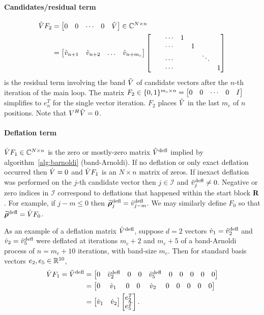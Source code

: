 \paragraph{Candidates/residual term}
\begin{align*}
\hat{V} F_2 &= \begin{bmatrix} 0&0&\cdots&0&\hat{V}\end{bmatrix}\in\mathbb{C}^{N \times n}\\
&= \begin{bmatrix} \hat{v}_{n+1}&\hat{v}_{n+2} &\ldots&\hat{v}_{n+ m_c}\end{bmatrix}
\begin{bmatrix} &&\cdots&1\\
 &&\cdots&&1 \\
    &&\cdots&&&\ddots \\ 
    &&\cdots&&&&1 \end{bmatrix}
\end{align*}
 is the residual term involving the band $\hat{V}$ of candidate vectors after the $n$-th iteration of the main loop.
The matrix $F_2\in\{0,1 \}^{m_c\times n}=\begin{bmatrix} 0&0&\cdots&0&I\end{bmatrix}$ simplifies to $e^T_n$ for the single vector iteration.  $F_2$ places $\hat{V}$ in the last $m_c$ of $n$ positions.   Note that $V^H\hat{V}=0$.



\paragraph{Deflation term}
$\dot{V} F_1\in\mathbb{C}^{N\times n}$ is the zero or mostly-zero matrix $\hat{V}^{\text{defl}}$ implied by algorithm~\ref{alg:barnoldi} (band-Arnoldi).  If no deflation or only exact deflation occurred then $\dot{V}=0$ and $\dot{V} F_1$ is an $N\times n$ matrix of zeros.   If inexact deflation was performed on the $j$-th candidate vector then $j\in\mathcal{I}$ and $\hat{v}^{\text{defl}}_j\neq 0$.   Negative or zero indices  in $\mathcal{I}$ correspond to deflations that happened within the start block $\textbf{\textup{R}}$.  For example, if $j-m\leq 0$ then $\widetilde{\boldsymbol{\rho}}^{\text{defl}}_j=\hat{v}^{\text{defl}}_{j-m}$.   We may similarly define $F_0$ so that $\widetilde{\boldsymbol{\rho}}^{\text{defl}}=\dot{V} F_0$.

As an example of a deflation matrix $ \hat{V}^{\text{defl}} $,  suppose $d=2$ vectors $\dot{v}_1=\hat{v}^{\text{defl}}_2$ and $\dot{v}_2=\hat{v}^{\text{defl}}_5$ were deflated at iterations $m_c+2$ and $m_c+5$ of a band-Arnoldi process of $n=m_c+10$ iterations, with band-size $m_c$. Then for standard basis vectors $e_2,e_5\in\mathbb{R}^{10}$,
\begin{equation}
\begin{aligned}
\Vd F_1  = \Vh^\defl &=  \mat{0&\vh^\defl_2&0&0&\vh^\defl_5&0&0&0&0&0} \\
&= \mat{0&\ \vd_1\ &0&0&\ \vd_2\ &0&0&0&0&0}\\
&= \mat{\vd_1&\vd_2}\mat{e_2^T \\ e_5^T}.
\end{aligned}
\label{eq:ex_V_defl}
\end{equation}


